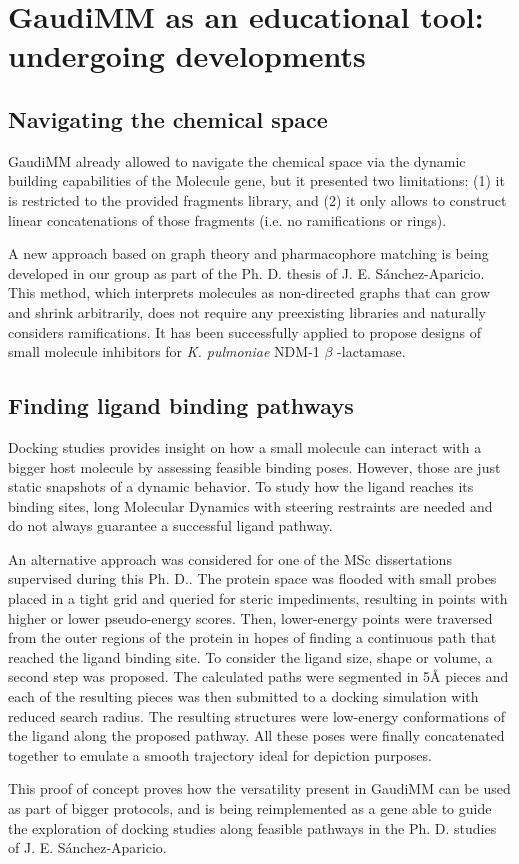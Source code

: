\chapter{GaudiMM as an educational tool: undergoing developments}
\label{chap:appendix-b}


\section{Navigating the chemical space}
GaudiMM already allowed to navigate the chemical space via the dynamic building capabilities of the Molecule gene, but it presented two limitations: (1) it is restricted to the provided fragments library, and (2) it only allows to construct linear concatenations of those fragments (i.e. no ramifications or rings).

A new approach based on graph theory and pharmacophore matching is being developed in our group as part of the Ph. D. thesis of J. E. Sánchez-Aparicio. This method, which interprets molecules as non-directed graphs that can grow and shrink arbitrarily, does not require any preexisting libraries and naturally considers ramifications. It has been successfully applied to propose designs of small molecule inhibitors for \textit{K. pulmoniae} NDM-1 $ \beta $ -lactamase.

\section{Finding ligand binding pathways}
Docking studies provides insight on how a small molecule can interact with a bigger host molecule by assessing feasible binding poses. However, those are just static snapshots of a dynamic behavior. To study how the ligand reaches its binding sites, long Molecular Dynamics with steering restraints are needed and do not always guarantee a successful ligand pathway.

An alternative approach was considered for one of the MSc dissertations supervised during this Ph. D.. The protein space was flooded with small probes placed in a tight grid and queried for steric impediments, resulting in points with higher or lower pseudo-energy scores. Then, lower-energy points were traversed from the outer regions of the protein in hopes of finding a continuous path that reached the ligand binding site. To consider the ligand size, shape or volume, a second step was proposed. The calculated paths were segmented in 5Å pieces and each of the resulting pieces was then submitted to a docking simulation with reduced search radius. The resulting structures were low-energy conformations of the ligand along the proposed pathway. All these poses were finally concatenated together to emulate a smooth trajectory ideal for depiction purposes.

This proof of concept proves how the versatility present in GaudiMM can be used as part of bigger protocols, and is being reimplemented as a gene able to guide the exploration of docking studies along feasible pathways in the Ph. D. studies of J. E. Sánchez-Aparicio.

